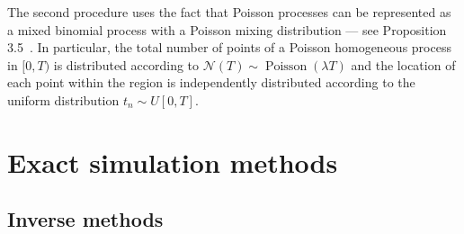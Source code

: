 \documentclass{juliacon}
\numberwithin{equation}{section}
\begin{document}
The second procedure uses the fact that Poisson processes can be represented as a mixed binomial process with a Poisson mixing distribution --- see Proposition 3.5~\cite{last2017}. In particular, the total number of points of a Poisson homogeneous process in \( [0, T) \) is distributed according to \( \mathcal{N} (T) \sim \operatorname{Poisson}( \lambda T ) \) and the location of each point within the region is independently distributed according to the uniform distribution \( t_n \sim U[0, T] \).




\section{Exact simulation methods} \label{sec:act}

\subsection{Inverse methods} \label{subsec:sim-inverse}
\end{document}
